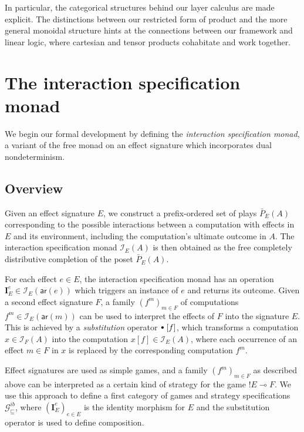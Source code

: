 \documentclass[draft,11pt]{report}
\theoremstyle{definition}
\newcommand{\gcat}{\mathcal{G}_{\sqsubseteq}}
\newcommand{\kw}[1]{\ensuremath{ \mathsf{#1} }}
\newcommand{\sbt}{\,\begin{picture}(-1,1)(-1,-3)\circle*{3}\end{picture}\ }
\begin{document}
In particular,
the categorical structures behind our layer calculus
are made explicit.
The distinctions between our restricted form of product
and the more general monoidal structure
hints at the connections between our framework
and linear logic,
where cartesian and tensor products cohabitate
and work together.



\chapter{The interaction specification monad} \label{sec:intspec} %

We begin our formal development
by defining the \emph{interaction specification monad},
a variant of the free monad on an effect signature which
incorporates dual nondeterminism.

\section{Overview} %

Given an effect signature $E$,
we construct a prefix-ordered set of plays $\bar{P}_E(A)$
corresponding to the possible interactions between
a computation with effects in $E$
and its environment,
including the computation's ultimate outcome in $A$.
The interaction specification monad $\mathcal{I}_E(A)$ is then obtained
as the free completely distributive completion of the poset $\bar{P}_E(A)$.

For each effect $e \in E$,
the interaction specification monad
has an operation
$\mathbf{I}_E^e \in \mathcal{I}_E(\kw{ar}(e))$
which triggers an instance of $e$ and returns its outcome.
Given a second effect signature $F$,
a family $(f^m)_{m \in F}$ of computations
$f^m \in \mathcal{I}_E(\kw{ar}(m))$
can be used to interpret the effects of $F$
into the signature $E$.
This is achieved by a \emph{substitution} operator $\sbt\ [f]$,
which transforms a computation $x \in \mathcal{I}_F(A)$
into the computation $x[f] \in \mathcal{I}_E(A)$,
where each occurrence of an effect $m \in F$ in $x$
is replaced by the corresponding computation $f^m$.

Effect signatures are used as
simple games,
and a family $(f^m)_{m \in F}$ as described above
can be interpreted as
a certain kind of strategy for the game ${!E} \multimap F$.
We use this approach to define
a first category of games and strategy specifications $\gcat^{ib}$,
where $(\mathbf{I}_E^e)_{e \in E}$ is %
the identity morphism for $E$ and
the substitution operator
is used to define composition.
\end{document}
